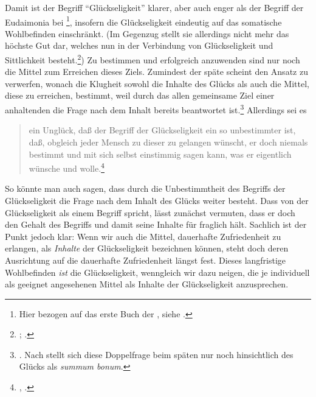 Damit ist der Begriff \enquote{Glückseligkeit} klarer, aber auch enger als der
Begriff der Eudaimonia bei \footnote{Hier bezogen auf
das erste Buch der , siehe
\cite[][1--12]{Aristoteles:NikomachischeEthik1972}.}, insofern
 die Glückseligkeit eindeutig auf das somatische Wohlbefinden einschränkt. (Im Gegenzug stellt sie allerdings nicht mehr das höchste Gut dar, welches nun in der Verbindung von Glückseligkeit und Sittlichkeit
besteht.\footnote{\cite[Vgl.][B 841\,f.]{Kant:KritikderreinenVernunft2003};
\cite[][III: 527.33--528.15]{Kant:GesammelteWerke1900ff.}.}) Zu bestimmen und
erfolgreich anzuwenden sind nur noch die Mittel zum Erreichen dieses Ziels.
Zumindest der späte  scheint den Ansatz zu verwerfen,
wonach die Klugheit sowohl die Inhalte des Glücks als auch die Mittel, diese zu
erreichen, bestimmt, weil durch das allen gemeinsame Ziel einer anhaltenden
 die Frage nach dem Inhalt bereits beantwortet
ist.\footnote{\cite[Vgl.][\pno~185f.]{Schwaiger:KategorischeundandereImperative1999}.
Nach  stellt sich
diese Doppelfrage beim späten  nur noch hinsichtlich des
Glücks als \emph{summum bonum}.} Allerdings
sei es
\begin{quote}
  ein Unglück, daß der Begriff der Glückseligkeit ein so unbestimmter ist, daß,
  obgleich jeder Mensch zu dieser zu gelangen wünscht, er doch niemals bestimmt
  und mit sich selbst einstimmig sagen kann, was er eigentlich wünsche und
  wolle.\footnote{\cite[BA~46]{Kant:GrundlegungzurMetaphysikderSitten1965},
  \cite[IV: 418.1--4]{Kant:GesammelteWerke1900ff.}.}
\end{quote}
So könnte man auch sagen, dass durch die Unbestimmtheit des Begriffs der
Glückseligkeit die Frage nach dem Inhalt des Glücks weiter besteht. Dass
 von der Glückseligkeit als einem
 Begriff spricht, lässt zunächst vermuten, dass er
doch den Gehalt des Begriffs und damit seine Inhalte für fraglich hält. Sachlich
ist der Punkt jedoch klar: Wenn wir auch die Mittel, dauerhafte Zufriedenheit zu
erlangen, als \emph{Inhalte} der Glückseligkeit bezeichnen können, steht doch
deren Ausrichtung auf die dauerhafte Zufriedenheit längst fest. Dieses
langfristige Wohlbefinden \emph{ist} die Glückseligkeit, wenngleich wir dazu
neigen, die je individuell als geeignet angesehenen Mittel als Inhalte der
Glückseligkeit anzusprechen.

